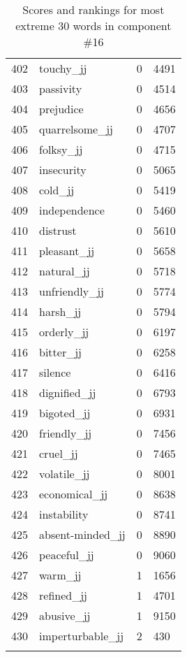 \begin{longtable}[!htbp]{| rlr@{.}l |}
    402 & touchy\_jj & 0 & 4491 \\
    403 & passivity & 0 & 4514 \\
    404 & prejudice & 0 & 4656 \\
    405 & quarrelsome\_jj & 0 & 4707 \\
    406 & folksy\_jj & 0 & 4715 \\
    407 & insecurity & 0 & 5065 \\
    408 & cold\_jj & 0 & 5419 \\
    409 & independence & 0 & 5460 \\
    410 & distrust & 0 & 5610 \\
    411 & pleasant\_jj & 0 & 5658 \\
    412 & natural\_jj & 0 & 5718 \\
    413 & unfriendly\_jj & 0 & 5774 \\
    414 & harsh\_jj & 0 & 5794 \\
    415 & orderly\_jj & 0 & 6197 \\
    416 & bitter\_jj & 0 & 6258 \\
    417 & silence & 0 & 6416 \\
    418 & dignified\_jj & 0 & 6793 \\
    419 & bigoted\_jj & 0 & 6931 \\
    420 & friendly\_jj & 0 & 7456 \\
    421 & cruel\_jj & 0 & 7465 \\
    422 & volatile\_jj & 0 & 8001 \\
    423 & economical\_jj & 0 & 8638 \\
    424 & instability & 0 & 8741 \\
    425 & absent-minded\_jj & 0 & 8890 \\
    426 & peaceful\_jj & 0 & 9060 \\
    427 & warm\_jj & 1 & 1656 \\
    428 & refined\_jj & 1 & 4701 \\
    429 & abusive\_jj & 1 & 9150 \\
    430 & imperturbable\_jj & 2 & 430 \\
    \hline
    \caption{Scores and rankings for most extreme 30 words in component \#16} \\
\end{longtable}
